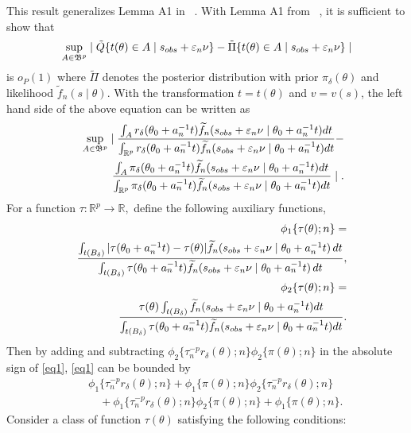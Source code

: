 	This result generalizes Lemma A1 in ~\cite{Li2017}. With Lemma A1 from ~\cite{Li2017}, it is sufficient to show that 
	\[
	\sup_{A\in\mathfrak{B}^{p}}\mid\tilde{Q}\{t(\theta)\in A\mid s_{\relax obs}+\varepsilon_{n}\nu\}-\tilde{\Pi}\{t(\theta)\in A\mid s_{\relax obs}+\varepsilon_{n}\nu\}\mid
	\]
	is $o_{P}(1)$ where $\tilde{\Pi}$ denotes the posterior distribution with prior $\pi_{\delta}(\theta)$ and likelihood $\tilde{f}_n(s \mid \theta)$. 
With the transformation $t=t(\theta)$
	and $v=v(s)$, the left hand side of the above equation can be written
	as 
	\begin{eqnarray}
	&&\hspace{-0.7cm}\sup_{A\in\mathfrak{B}^{p}}\mid\frac{\int_{A}r_{\delta}(\theta_0+a_{n}^{-1}t)\ftil_{n}(s_{{\rm obs}}+\veps_{n}\nu\mid\theta_0+a_{n}^{-1}t)dt}{\int_{\mathbb{R}^{p}}r_{\delta}(\theta_0+a_{n}^{-1}t)\ftil_{n}(s_{{\rm obs}}+\veps_{n}\nu\mid\theta_0+a_{n}^{-1}t)dt}-\hfill  \label{eq1} \\
	&&\hspace{1cm}\frac{\int_{A}\pi_{\delta}(\theta_0+a_{n}^{-1}t)\ftil_{n}(s_{{\rm obs}}+\veps_{n}\nu\mid\theta_0+a_{n}^{-1}t)dt}{\int_{\mathbb{R}^{p}}\pi_{\delta}(\theta_0+a_{n}^{-1}t)\ftil_{n}(s_{{\rm obs}}+\veps_{n}\nu\mid\theta_0+a_{n}^{-1}t)dt}\mid. \nonumber 
	\end{eqnarray}
	For a function $\tau:\mathbb{R}^{p}\rightarrow\mathbb{R},$ define
	the following auxiliary functions,
	\begin{eqnarray*}
		&&\phi_{1}\{\tau(\theta);n\}  = \\ 
		&&\frac{\int_{t(B_{\delta})}|\tau(\theta_0+a_{n}^{-1}t)-\tau(\theta)|\widetilde{f}_{n}(s_{{\relax obs}}+\varepsilon_{n}\nu\mid\theta_0+a_{n}^{-1}t)\,dt}{\int_{t(B_{\delta})}\tau(\theta_0+a_{n}^{-1}t)\widetilde{f}_{n}(s_{{\relax obs}}+\varepsilon_{n}\nu\mid\theta_0+a_{n}^{-1}t)\,dt},\\
		&&\phi_{2}\{\tau(\theta);n\}  =  \\
		&&\frac{\tau(\theta)\int_{t(B_{\delta})}\widetilde{f}_{n}(s_{{\relax obs}}+\varepsilon_{n}\nu\mid\theta_0+a_{n}^{-1}t)dt}{\int_{t(B_{\delta})}\tau(\theta_0+a_{n}^{-1}t)\widetilde{f}_{n}(s_{{\relax obs}}+\varepsilon_{n}\nu\mid\theta_{0}+a_{n}^{-1}t)dt}.
	\end{eqnarray*}
	Then by adding and subtracting $\phi_{2}\{\tau_{n}^{-p}r_{\delta}(\theta);n\}\phi_{2}\{\pi(\theta);n\}$
	in the absolute sign of \eqref{eq1}, \eqref{eq1} can be bounded
	by 
	\begin{eqnarray*}
		&&\phi_{1}\{\tau_{n}^{-p}r_{\delta}(\theta);n\}+\phi_{1}\{\pi(\theta);n\}\phi_{2}\{\tau_{n}^{-p}r_{\delta}(\theta);n\} \\
		&&\quad +\phi_{1}\{\tau_{n}^{-p}r_{\delta}(\theta);n\}\phi_{2}\{\pi(\theta);n\}+\phi_{1}\{\pi(\theta);n\}.
	\end{eqnarray*}
	Consider a class of function $\tau(\theta)$ satisfying the following
	conditions: 
	

